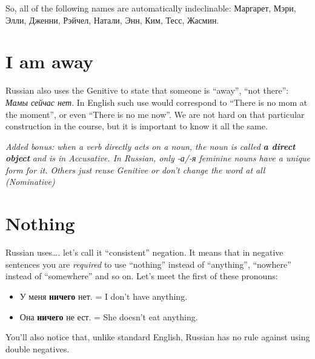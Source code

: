 So, all of the following names are automatically indeclinable: Маргарет,
Мэри, Элли, Дженни, Рэйчел, Натали, Энн, Ким, Тесс, Жасмин.

\section{I am away}\label{i-am-away}

Russian also uses the Genitive to state that someone is ``away'', ``not
there'': \emph{Мамы сейчас нет}. In English such use would correspond to
``There is no mom at the moment'', or even ``There is no me now''. We
are not hard on that particular construction in the course, but it is
important to know it all the same.

\emph{Added bonus: when a verb directly acts on a noun, the noun is
called} \textbf{\emph{a direct object}} \emph{and is in Accusative. In
Russian, only -а/-я feminine nouns have a unique form for it. Others
just reuse Genitive or don't change the word at all (Nominative)}

\section{Nothing}\label{nothing}

Russian uses\ldots{}. let's call it ``consistent'' negation. It means
that in negative sentences you are \emph{required} to use ``nothing''
instead of ``anything'', ``nowhere'' instead of ``somewhere'' and so on.
Let's meet the first of these pronouns:

\begin{itemize}
\tightlist
\item
  У меня \textbf{ничего} нет. = I don't have anything.
\item
  Она \textbf{ничего} не ест. = She doesn't eat anything.
\end{itemize}

You'll also notice that, unlike standard English, Russian has no rule
against using double negatives.
